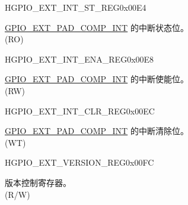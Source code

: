 \begin{register}{H}{GPIO\_EXT\_INT\_ST\_REG}{0x00E4}\label{regdesc:GPIOSDINTSTREG}
%
%
\regnewline%
\begin{regdesc}\begin{reglist}
\label{fielddesc:GPIOSDPADCOMPINTST}\item [GPIO\_EXT\_PAD\_COMP\_INT\_ST] \hyperref[sec:zcd_pads]{GPIO\_EXT\_PAD\_COMP\_INT} 的中断状态位。\\
(RO)
\end{reglist}\end{regdesc}
\end{register}

\begin{register}{H}{GPIO\_EXT\_INT\_ENA\_REG}{0x00E8}\label{regdesc:GPIOSDINTENAREG}
%
%
\regnewline%
\begin{regdesc}\begin{reglist}
\label{fielddesc:GPIOSDPADCOMPINTENA}\item [GPIO\_EXT\_PAD\_COMP\_INT\_ENA] \hyperref[sec:zcd_pads]{GPIO\_EXT\_PAD\_COMP\_INT} 的中断使能位。\\
(RW)
\end{reglist}\end{regdesc}
\end{register}

\begin{register}{H}{GPIO\_EXT\_INT\_CLR\_REG}{0x00EC}\label{regdesc:GPIOSDINTCLRREG}
%
%
\regnewline%
\begin{regdesc}\begin{reglist}
\label{fielddesc:GPIOSDPADCOMPINTCLR}\item [GPIO\_EXT\_PAD\_COMP\_INT\_CLR] \hyperref[sec:zcd_pads]{GPIO\_EXT\_PAD\_COMP\_INT} 的中断清除位。\\
(WT)
\end{reglist}\end{regdesc}
\end{register}

\begin{register}{H}{GPIO\_EXT\_VERSION\_REG}{0x00FC}\label{regdesc:GPIOSDVERSIONREG}
%
%
\regnewline%
\begin{regdesc}\begin{reglist}
\label{fielddesc:GPIOSDGPIOSDDATE}\item [GPIO\_EXT\_DATE] 版本控制寄存器。 \\ (R/W)
\end{reglist}\end{regdesc}
\end{register}

